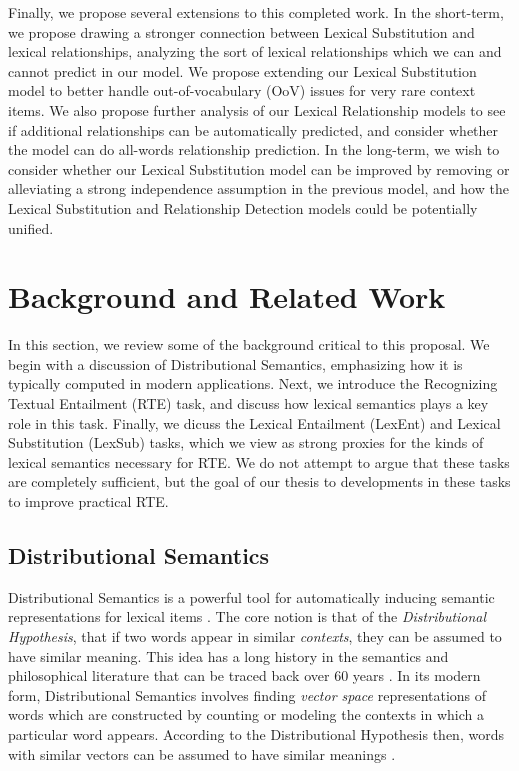 \documentclass[12pt]{article}
\begin{document}
Finally, we propose several extensions to this completed work. In the
short-term, we propose drawing a stronger connection between Lexical
Substitution and lexical relationships, analyzing the sort of lexical
relationships which we can and cannot predict in our model. We propose
extending our Lexical Substitution model to better handle out-of-vocabulary
(OoV) issues for very rare context items. We also propose further analysis of
our Lexical Relationship models to see if additional relationships can be
automatically predicted, and consider whether the model can do all-words
relationship prediction.  In the long-term, we wish to consider whether our
Lexical Substitution model can be improved by removing or alleviating a strong
independence assumption in the previous model, and how the Lexical Substitution
and Relationship Detection models could be potentially unified.


\section{Background and Related Work}
\label{sec:background}

In this section, we review some of the background critical to this proposal.
We begin with a discussion of Distributional Semantics, emphasizing how it is
typically computed in modern applications. Next, we introduce the Recognizing
Textual Entailment (RTE) task, and discuss how lexical semantics plays a key
role in this task. Finally, we dicuss the Lexical Entailment (LexEnt) and
Lexical Substitution (LexSub) tasks, which we view as strong proxies for the
kinds of lexical semantics necessary for RTE. We do not attempt to argue that
these tasks are completely sufficient, but the goal of our thesis to
developments in these tasks to improve practical RTE.

\subsection{Distributional Semantics}
\label{sec:dist}

Distributional Semantics is a powerful tool for automatically inducing semantic
representations for lexical items \cite{turney:2010:jair,erk:2012:llc}.  The
core notion is that of the {\em Distributional Hypothesis}, that if two words
appear in similar {\em contexts}, they can be assumed to have similar meaning.
This idea has a long history in the semantics and philosophical literature that
can be traced back over 60 years
\cite{wittgenstein:1953:pi,harris:1954:word,firth:1957:la}. In its modern form,
Distributional Semantics involves finding {\em vector space} representations of
words which are constructed by counting or modeling the contexts in which a
particular word appears. According to the Distributional Hypothesis then, words
with similar vectors can be assumed to have similar meanings
\cite{turney:2010:jair}.
\end{document}
